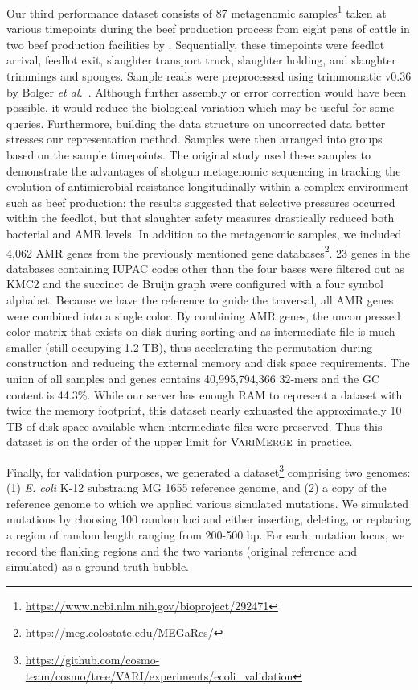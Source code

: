 Our third performance dataset consists of 87 metagenomic samples\footnote{\url{https://www.ncbi.nlm.nih.gov/bioproject/292471}} taken at various timepoints during the beef production process from eight pens of cattle in two beef production facilities by \cite{noyes2016resistome}.  Sequentially, these timepoints were feedlot arrival, feedlot exit, slaughter transport truck, slaughter holding, and slaughter trimmings and sponges.  Sample reads were preprocessed using trimmomatic v0.36 by Bolger \emph{et al.}~\citep{bolger2014trimmomatic}.  Although further assembly or error correction would have been possible, it would reduce the biological variation which may be useful for some queries.  Furthermore, building the data structure on uncorrected data better stresses our representation method.  Samples were then arranged into groups based on the sample timepoints. The original study used these samples to demonstrate the advantages of shotgun metagenomic sequencing in tracking the evolution of antimicrobial resistance longitudinally within a complex environment such as beef production; the results suggested that selective pressures occurred within the feedlot, but that slaughter safety measures drastically reduced both bacterial and AMR levels.  In addition to the metagenomic samples, we included 4,062 AMR genes from the previously mentioned gene databases\footnote{\url{https://meg.colostate.edu/MEGaRes/}}.  23 genes in the databases containing IUPAC codes other than the four bases were filtered out as KMC2 and the succinct de Bruijn graph were configured with a four symbol alphabet.  Because we have the reference to guide the traversal, all AMR genes were combined into a single color.  By combining AMR genes, the uncompressed color matrix that exists on disk during sorting and as intermediate file is much smaller (still occupying 1.2 TB), thus accelerating the permutation during construction and reducing the external memory and disk space requirements.  The union of all samples and genes contains 40,995,794,366 32-mers and the GC content is 44.3\%.  While our server has enough RAM to represent a dataset with twice the memory footprint, this dataset nearly exhuasted the approximately 10 TB of disk space available when intermediate files were preserved.  Thus this dataset is on the order of the upper limit for $\mbox{\rm {\sc VariMerge}}$ in practice.

Finally, for validation purposes, we generated a dataset\footnote{\url{https://github.com/cosmo-team/cosmo/tree/VARI/experiments/ecoli_validation}} comprising two genomes: (1) \emph{E. coli} K-12 substraing MG 1655 reference genome, and (2) a copy of the reference genome to which we applied various simulated mutations.  We simulated mutations by choosing 100 random loci and either inserting, deleting, or replacing a region of random length ranging from 200-500 bp.  For each mutation locus, we record the flanking regions and the two variants (original reference and simulated) as a ground truth bubble.




